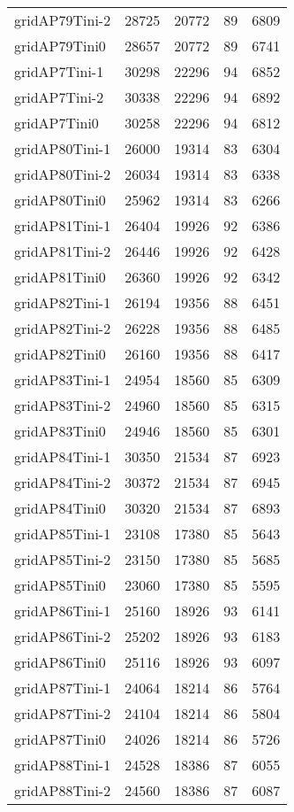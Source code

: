 \begin{longtable}{lrrrr}
gridAP79Tini-2 & 28725 & 20772 & 89 & 6809 \\
gridAP79Tini0 & 28657 & 20772 & 89 & 6741 \\
gridAP7Tini-1 & 30298 & 22296 & 94 & 6852 \\
gridAP7Tini-2 & 30338 & 22296 & 94 & 6892 \\
gridAP7Tini0 & 30258 & 22296 & 94 & 6812 \\
gridAP80Tini-1 & 26000 & 19314 & 83 & 6304 \\
gridAP80Tini-2 & 26034 & 19314 & 83 & 6338 \\
gridAP80Tini0 & 25962 & 19314 & 83 & 6266 \\
gridAP81Tini-1 & 26404 & 19926 & 92 & 6386 \\
gridAP81Tini-2 & 26446 & 19926 & 92 & 6428 \\
gridAP81Tini0 & 26360 & 19926 & 92 & 6342 \\
gridAP82Tini-1 & 26194 & 19356 & 88 & 6451 \\
gridAP82Tini-2 & 26228 & 19356 & 88 & 6485 \\
gridAP82Tini0 & 26160 & 19356 & 88 & 6417 \\
gridAP83Tini-1 & 24954 & 18560 & 85 & 6309 \\
gridAP83Tini-2 & 24960 & 18560 & 85 & 6315 \\
gridAP83Tini0 & 24946 & 18560 & 85 & 6301 \\
gridAP84Tini-1 & 30350 & 21534 & 87 & 6923 \\
gridAP84Tini-2 & 30372 & 21534 & 87 & 6945 \\
gridAP84Tini0 & 30320 & 21534 & 87 & 6893 \\
gridAP85Tini-1 & 23108 & 17380 & 85 & 5643 \\
gridAP85Tini-2 & 23150 & 17380 & 85 & 5685 \\
gridAP85Tini0 & 23060 & 17380 & 85 & 5595 \\
gridAP86Tini-1 & 25160 & 18926 & 93 & 6141 \\
gridAP86Tini-2 & 25202 & 18926 & 93 & 6183 \\
gridAP86Tini0 & 25116 & 18926 & 93 & 6097 \\
gridAP87Tini-1 & 24064 & 18214 & 86 & 5764 \\
gridAP87Tini-2 & 24104 & 18214 & 86 & 5804 \\
gridAP87Tini0 & 24026 & 18214 & 86 & 5726 \\
gridAP88Tini-1 & 24528 & 18386 & 87 & 6055 \\
gridAP88Tini-2 & 24560 & 18386 & 87 & 6087 \\

\end{longtable}

